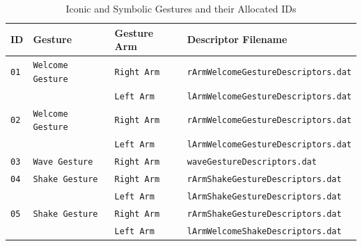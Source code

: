 \documentclass{CSSRforAfrica}
\begin{document}
\begin{longtable}[c]{|l|l|l|l|}
    \caption{Iconic and Symbolic Gestures and their Allocated IDs} \label{tab:Gesture_IDs} \\
    \hline
    \rowcolor{gray!40}
    \footnotesize{\textbf{ID}} & \footnotesize{\textbf{Gesture}} & \footnotesize{\textbf{Gesture Arm}} &  \footnotesize{\textbf{Descriptor Filename}} \\ \hline
    \endhead %
    
   \footnotesize{\texttt{01}} & \footnotesize{\texttt{Welcome Gesture}}  &  \footnotesize{\texttt{Right Arm}} &  \footnotesize{\texttt{rArmWelcomeGestureDescriptors.dat}}  \\ 
   \footnotesize{} & \footnotesize{} &  \footnotesize{\texttt{Left Arm}} & \footnotesize{\texttt{lArmWelcomeGestureDescriptors.dat}}  \\ \hline
   
     \footnotesize{\texttt{02}} & \footnotesize{\texttt{Welcome Gesture}}  &  \footnotesize{\texttt{Right Arm}} &  \footnotesize{\texttt{rArmWelcomeGestureDescriptors.dat}}  \\ 
   \footnotesize{} & \footnotesize{} &  \footnotesize{\texttt{Left Arm}} & \footnotesize{\texttt{lArmWelcomeGestureDescriptors.dat}}  \\ \hline
   
    \footnotesize{\texttt{03}} & \footnotesize{\texttt{Wave Gesture}} &  \footnotesize{\texttt{Right Arm}} &  \footnotesize{\texttt{waveGestureDescriptors.dat}}  \\ \hline
    
    \footnotesize{\texttt{04}} & \footnotesize{\texttt{Shake Gesture}}  &  \footnotesize{\texttt{Right Arm}} &  \footnotesize{\texttt{rArmShakeGestureDescriptors.dat}}  \\ 
   \footnotesize{} & \footnotesize{} &  \footnotesize{\texttt{Left Arm}} & \footnotesize{\texttt{lArmShakeGestureDescriptors.dat}}  \\ \hline
   
   \footnotesize{\texttt{05}} & \footnotesize{\texttt{Shake Gesture}}  &  \footnotesize{\texttt{Right Arm}} &  \footnotesize{\texttt{rArmShakeGestureDescriptors.dat}}  \\ 
   \footnotesize{} & \footnotesize{} &  \footnotesize{\texttt{Left Arm}} & \footnotesize{\texttt{lArmWelcomeShakeDescriptors.dat}}  \\ \hline
    
\end{longtable}
\end{document}
